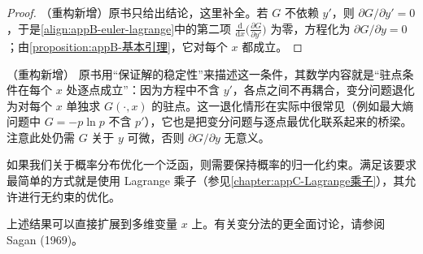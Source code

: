 \documentclass[../main.tex]{subfiles}
\begin{document}
\begin{proof}
（重构新增）原书只给出结论，这里补全。若 $G$ 不依赖 $y'$，则 $\partial G/\partial y'=0$，于是\eqref{align:appB-euler-lagrange}中的第二项 $\frac{\mathrm{d}}{\mathrm{d}x}\bigl(\frac{\partial G}{\partial y'}\bigr)$ 为零，方程化为 $\partial G/\partial y=0$；由\cref{proposition:appB-基本引理}，它对每个 $x$ 都成立。
\end{proof}

\begin{remark}（重构新增）
原书用“保证解的稳定性”来描述这一条件，其数学内容就是“驻点条件在每个 $x$ 处逐点成立”：因为方程中不含 $y'$，各点之间不再耦合，变分问题退化为对每个 $x$ 单独求 $G(\cdot,x)$ 的驻点。这一退化情形在实际中很常见（例如最大熵问题中 $G=-p\ln p$ 不含 $p'$），它也是把变分问题与逐点最优化联系起来的桥梁。注意此处仍需 $G$ 关于 $y$ 可微，否则 $\partial G/\partial y$ 无意义。
\end{remark}

如果我们关于概率分布优化一个泛函，则需要保持概率的归一化约束。满足该要求最简单的方式就是使用 Lagrange 乘子（参见\cref{chapter:appC-Lagrange乘子}），其允许进行无约束的优化。

上述结果可以直接扩展到多维变量 $x$ 上。有关变分法的更全面讨论，请参阅 Sagan (1969)。
\end{document}
